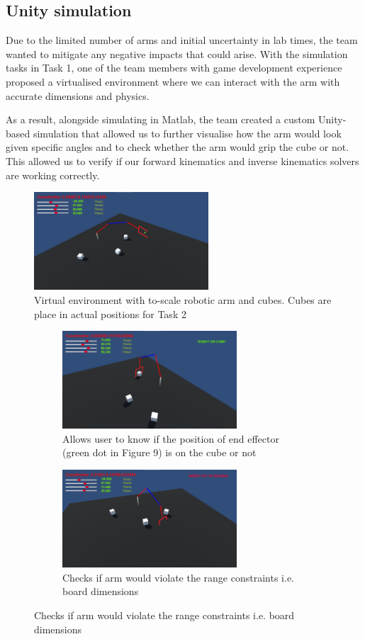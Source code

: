 \documentclass[9pt, a4paper]{article}
\begin{document}
\subsection{Unity simulation}

Due to the limited number of arms and initial uncertainty in lab times, the team
wanted to mitigate any negative impacts that could arise. With the simulation
tasks in Task 1, one of the team members with game development experience
proposed a virtualised environment where we can interact with the arm with
accurate dimensions and physics. 

As a result, alongside simulating in Matlab, the team created a custom Unity-based
simulation that allowed us to further visualise how the arm would look given
specific angles and to check whether the arm would grip the cube or not. This
allowed us to verify if our forward kinematics and inverse kinematics solvers
are working correctly. 
\begin{figure}[h]
    \centering
    \includegraphics[width=6.5cm]{moving.png}
    \caption{Virtual environment with to-scale robotic arm and cubes. Cubes are place in actual positions for Task 2}
\end{figure}
\begin{figure}[h]
  \centering
  \begin{subfigure}{.48\textwidth}
    \centering
    \includegraphics[width=6.5cm]{on cube.png}
    \caption{Allows user to know if the position of end effector (green dot in Figure 9) is on the cube or not}
  \end{subfigure}%
  \begin{subfigure}{.48\textwidth}
    \centering
    \includegraphics[width=6.5cm]{out of bounds.png}
    \caption{Checks if arm would violate the range constraints i.e. board dimensions}
  \end{subfigure}
\end{figure}
\end{document}
